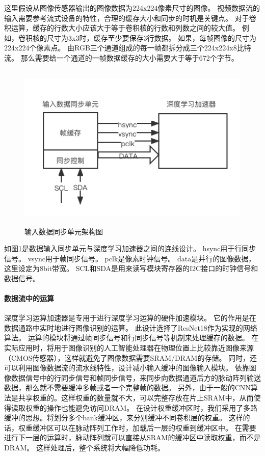 这里假设从图像传感器输出的图像数据为224x224像素尺寸的图像。
视频数据流的输入需要参考流式设备的特性，合理的缓存大小和同步的时机是关键点。
对于卷积运算，缓存的行数大小应该大于等于卷积核的行数和列数之间的较大值。
例如，卷积核的尺寸为3x3时，缓存至少要保存3行数据。
如果，每帧图像的尺寸为224x224个像素点。
由RGB三个通道组成的每一帧都拆分成三个224x224x8比特流。
那么需要给一个通道的一帧数据缓存的大小需要大于等于672个字节。

\begin{figure}[htbp]
    \centering
    \includegraphics[width=12cm,height=8cm]{figures/input_data_adapter.png}
    \caption{输入数据同步单元架构图}
    \label{fig:input_data_adapter}
\end{figure}

如图\ref{fig:input_data_adapter}是数据输入同步单元与深度学习加速器之间的连线设计。
hsync用于行同步信号。
vsync用于帧同步信号。
pclk是像素时钟信号。
data是并行的图像数据，这里设定为8bit带宽。
SCL和SDA是用来读写模块寄存器的I2C接口的时钟信号和数据信号。


\paragraph{数据流中的运算}
深度学习运算加速器是专用于进行深度学习运算的硬件加速模块。
它的作用是在数据通路中实时地进行图像识别的运算。
此设计选择了ResNet18作为实现的网络算法。
运算的模块将通过帧同步信号和行同步信号等机制来处理缓存的数据。
在实际应用时，将用于图像识别的人工智能处理器在物理位置上比较靠近图像来源（CMOS传感器），这样就避免了图像数据需要SRAM/DRAM的存储。
同时，还可以利用图像数据流的流水线特性，设计减小输入缓冲的图像输入模块。
依靠图像数据信号中的行同步信号和帧同步信号，来同步向数据通道后方的脉动阵列输送数据，那么就不需要缓冲多帧或者一个完整帧的数据。
另外，由于一般的CNN算法是共享权重的。这样权重的数量就不大，可以完整存放在片上SRAM中，从而使得读取权重的操作也能避免访问DRAM。
在设计权重缓冲区时，我们采用了多路缓冲的思想。将划分多个bank缓冲区，来分别缓冲不同卷积层的权重。
这样的话，权重缓冲区可以在脉动阵列工作时，加载后一层的权重到缓冲区中。
在需要进行下一层的运算时，脉动阵列就可以直接从SRAM的缓冲区中读取权重，而不是DRAM。
这样处理后，整个系统将大幅降低功耗。

